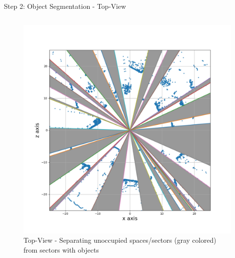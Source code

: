 \documentclass[9pt]{beamer}
\begin{document}
\begin{frame}[fragile]{Step 2: Object Segmentation - Top-View }
\begin{columns}
\begin{column}{0.48\textwidth}
\begin{figure}
			\includegraphics[width=\textwidth]{./images/sector-transforms/scene-with-sector.pdf}		
			\caption{Top-View - Separating unoccupied spaces/sectors (gray colored) from sectors with objects}
		\end{figure}
	\end{column}
\end{columns}

\end{frame}





\end{document}
